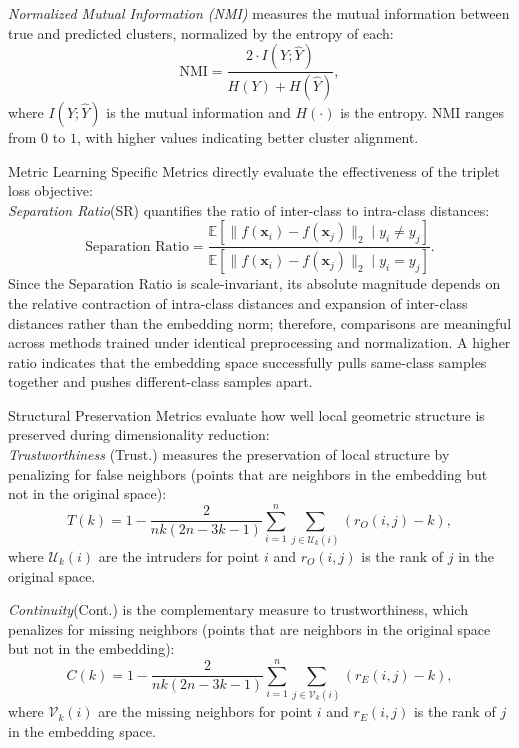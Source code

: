 \documentclass[a4paper,12pt,reqno]{amsart}
\theoremstyle{definition}
\theoremstyle{remark}
\begin{document}
 \textit{Normalized Mutual Information (NMI)} measures the mutual information between true and predicted clusters, normalized by the entropy of each:
	\begin{equation}
		\text{NMI} = \frac{2 \cdot I(Y; \hat{Y})}{H(Y) + H(\hat{Y})},
	\end{equation}
	where $I(Y; \hat{Y})$ is the mutual information and $H(\cdot)$ is the entropy. NMI ranges from $0$ to $1$, with higher values indicating better cluster alignment.


{Metric Learning Specific Metrics} directly evaluate the effectiveness of the triplet loss objective:\\
\textit{Separation Ratio}(SR) quantifies the ratio of inter-class to intra-class distances:
	\begin{equation}
		\text{Separation Ratio} = \frac{\mathbb{E}[\|f(\mathbf{x}_i) - f(\mathbf{x}_j)\|_2 \mid y_i \neq y_j]}{\mathbb{E}[\|f(\mathbf{x}_i) - f(\mathbf{x}_j)\|_2 \mid y_i = y_j]}.
	\end{equation}
Since the Separation Ratio is scale-invariant, its absolute magnitude depends on the relative contraction of intra-class distances and expansion of inter-class distances rather than the embedding norm; therefore, comparisons are meaningful across methods trained under identical preprocessing and normalization.
	A higher ratio indicates that the embedding space successfully pulls same-class samples together and pushes different-class samples apart.


{Structural Preservation Metrics} evaluate how well local geometric structure is preserved during dimensionality reduction:\\
 \textit{Trustworthiness} (Trust.) measures the preservation of local structure by penalizing for false neighbors (points that are neighbors in the embedding but not in the original space):
	\begin{equation}
		T(k) = 1 - \frac{2}{nk(2n - 3k - 1)} \sum_{i=1}^n \sum_{j \in \mathcal{U}_k(i)} (r_O(i,j) - k),
	\end{equation}
	where $\mathcal{U}_k(i)$ are the intruders for point $i$ and $r_O(i,j)$ is the rank of $j$ in the original space.
	
 \textit{Continuity}(Cont.) is the complementary measure to trustworthiness, which penalizes for missing neighbors (points that are neighbors in the original space but not in the embedding):
	\begin{equation}
		C(k) = 1 - \frac{2}{nk(2n - 3k - 1)} \sum_{i=1}^n \sum_{j \in \mathcal{V}_k(i)} (r_E(i,j) - k),
	\end{equation}
	where $\mathcal{V}_k(i)$ are the missing neighbors for point $i$ and $r_E(i,j)$ is the rank of $j$ in the embedding space.
\end{document}
